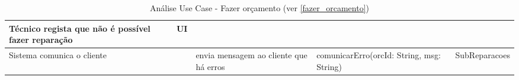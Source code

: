 \documentclass[../relatorio.tex]{subfiles}
\begin{document}
\begin{landscape}
\begin{table}[!h]
\begin{tabular}{|p{5cm}|p{1cm}|p{4cm}|p{6cm}|p{3cm}|}
            \\
            \rowcolor{yellow}
            \hline
            Técnico regista que não é possível fazer reparação
                     & 
            UI
                     & 
                     & 
                     & 
            \\
            \hline
            Sistema comunica o cliente
                     & 
                     & 
            envia mensagem ao cliente que há erros
                     & 
            comunicarErro(orcId: String, msg: String)
                     & 
            SubReparacoes
            \\
            \hline
        \end{tabular}
        \caption{Análise Use Case - Fazer orçamento (ver \ref{fazer_orcamento})}
    \end{table}
\end{landscape}
\end{document}
